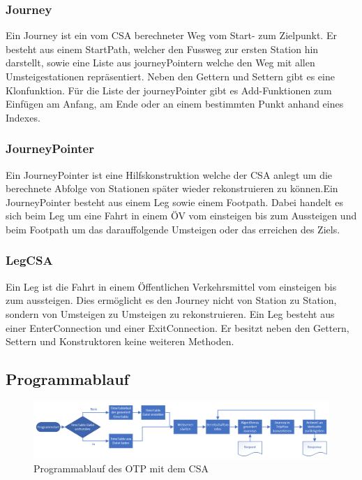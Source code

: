 \subsubsection{Journey}
Ein Journey ist ein vom CSA berechneter Weg vom Start- zum Zielpunkt. Er besteht aus einem StartPath, welcher den Fussweg zur ersten Station hin darstellt, sowie eine Liste aus journeyPointern welche den Weg mit allen Umsteigestationen repräsentiert. Neben den Gettern und Settern gibt es eine Klonfunktion. Für die Liste der journeyPointer gibt es Add-Funktionen zum Einfügen am Anfang, am Ende oder an einem bestimmten Punkt anhand eines Indexes.

\subsubsection{JourneyPointer}
Ein JourneyPointer ist eine Hilfskonstruktion welche der CSA anlegt um die berechnete Abfolge von Stationen später wieder rekonstruieren zu können.Ein JourneyPointer besteht aus einem Leg sowie einem Footpath. Dabei handelt es sich beim Leg um eine Fahrt in einem ÖV vom einsteigen bis zum Aussteigen und beim Footpath um das darauffolgende Umsteigen oder das erreichen des Ziels.

\subsubsection{LegCSA}
Ein Leg ist die Fahrt in einem Öffentlichen Verkehrsmittel vom einsteigen bis zum aussteigen. Dies ermöglicht es den Journey nicht von Station zu Station, sondern von Umsteigen zu Umsteigen zu rekonstruieren. Ein Leg besteht aus einer EnterConnection und einer ExitConnection. Er besitzt neben den Gettern, Settern und Konstruktoren keine weiteren Methoden.

\subsection{Programmablauf}
\begin{figure}[htb]
	\centering
	\includegraphics[width=15cm]{img/programmablauf.png}
	\caption{Programmablauf des OTP mit dem CSA}
	\label{fig:programmablauf}
\end{figure}

